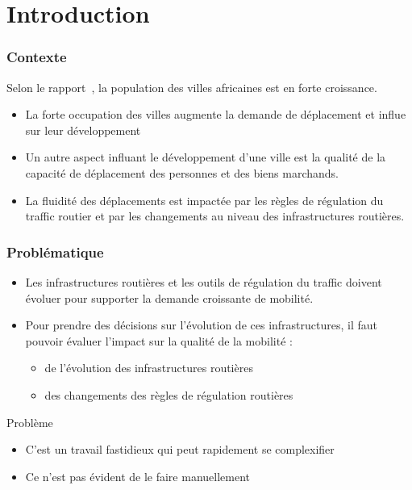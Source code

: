 \section{Introduction}\label{sec:section-1}
\begin{frame}
    \frametitle{Contexte}
    Selon le rapport~\autocite{somik2017opening}, la population des villes africaines est en forte croissance.

    \begin{itemize}
        \item La forte occupation des villes augmente la demande de déplacement et influe sur leur développement
        \item Un autre aspect influant le développement d'une ville est la qualité de la capacité de déplacement des personnes et des biens marchands.
        \item La fluidité des déplacements est impactée par les règles de régulation du traffic routier et par les changements au niveau des infrastructures routières.
    \end{itemize}

\end{frame}

\begin{frame}
    \frametitle{Problématique}

    \begin{itemize}
        \item Les infrastructures routières et les outils de régulation du traffic doivent évoluer pour supporter la demande croissante de mobilité.
        \item Pour prendre des décisions sur l'évolution de ces infrastructures, il faut pouvoir évaluer l'impact sur la qualité de la mobilité :
        \begin{itemize}
            \item de l'évolution des infrastructures routières
            \item des changements des règles de régulation routières
        \end{itemize}
    \end{itemize}

    \begin{alertblock}{Problème}

        \begin{itemize}
            \item C'est un travail fastidieux qui peut rapidement se complexifier
            \item Ce n'est pas évident de le faire manuellement
        \end{itemize}
    \end{alertblock}
\end{frame}


